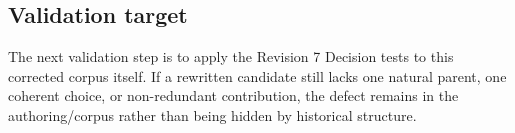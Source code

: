 \documentclass[
  10pt,
  a4paper,
]{article}
\begin{document}
\subsection{Validation target}\label{validation-target}

The next validation step is to apply the Revision 7 Decision tests to
this corrected corpus itself. If a rewritten candidate still lacks one
natural parent, one coherent choice, or non-redundant contribution, the
defect remains in the authoring/corpus rather than being hidden by
historical structure.
\end{document}
